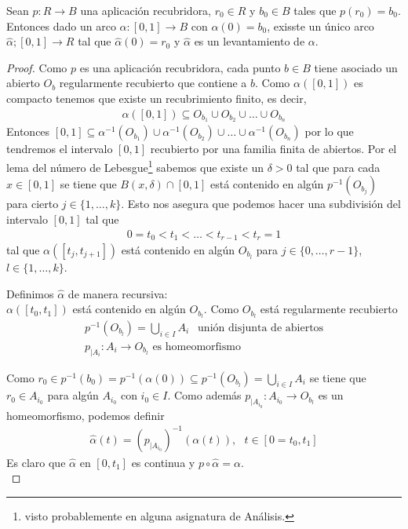 \begin{lema}
    Sean $p:R\to B$ una aplicación recubridora, $r_0\in R$ y $b_0\in B$ tales que $p(r_0)=b_0$. Entonces dado un arco $\alpha:[0,1]\to B$ con $\alpha(0)=b_0$, exisste un único arco $\hat{\alpha};[0,1]\to R$ tal que $\hat{\alpha}(0) = r_0$ y $\hat{\alpha}$ es un levantamiento de $\alpha$.

    \begin{proof}
        Como $p$ es una aplicación recubridora, cada punto $b\in B$ tiene asociado un abierto $O_b$ regularmente recubierto que contiene a $b$. Como $\alpha([0,1])$ es compacto tenemos que existe un recubrimiento finito, es decir,
        \begin{gather*}
            \alpha([0,1]) \subseteq O_{b_1} \cup O_{b_2}\cup \dots \cup O_{b_n}
        \end{gather*}
        Entonces $[0,1]\subseteq \alpha^{-1}( O_{b_1}) \cup \alpha^{-1}(O_{b_2})\cup \dots \cup \alpha^{-1}(O_{b_n})$ por lo que tendremos el intervalo $[0,1]$ recubierto por una familia finita de abiertos. Por el lema del número de Lebesgue\footnote{visto probablemente en alguna asignatura de Análisis.} sabemos que existe un $\delta>0$ tal que para cada $x\in[0,1]$ se tiene que $B(x,\delta)\cap[0,1]$ está contenido en algún $p^{-1}(O_{b_j})$ para cierto $j\in\{1,\dots,k\}$. Esto nos asegura que podemos hacer una subdivisión del intervalo $[0,1]$ tal que
        \begin{gather*}
            0 = t_0 < t_1 < \dots < t_{r-1} < t_r = 1
        \end{gather*}
        tal que $\alpha([t_j, t_{j+1}])$ está contenido en algún $O_{b_l}$ para $j\in\{0,\dots,r-1\}$, $l\in\{1,\dots,k\}$.

        Definimos $\hat{\alpha}$ de manera recursiva:\\

       $ \alpha([t_0,t_1])$ está contenido en algún $O_{b_l}$. Como $O_{b_l}$ está regularmente recubierto
       \begin{gather*}
            p^{-1}(O_{b_l}) = \bigcup\limits_{i\in I} A_i\ \ \text{ unión disjunta de abiertos}\\
            p_{|A_i}: A_i \to O_{b_l} \text{ es homeomorfismo}
       \end{gather*}

       Como $r_0\in p^{-1}(b_0) = p^{-1}(\alpha(0)) \subseteq p^{-1}(O_{b_l}) = \bigcup\limits_{i\in I}A_i$ se tiene que $r_0\in A_{i_0}$ para algún $A_{i_0}$ con $i_0\in I$. Como además $p_{|A_{i_0}}:A_{i_0} \to O_{b_l}$ es un homeomorfismo, podemos definir
       \begin{gather*}
            \hat{\alpha}(t) = (p_{|A_{i_0}})^{-1}(\alpha(t)),\ \ \ t\in [0=t_0, t_1]
       \end{gather*}
       Es claro que $\hat{\alpha}$ en $[0,t_1]$ es continua y $p\circ\hat{\alpha}=\alpha$.\\


\end{proof}
\end{lema}
